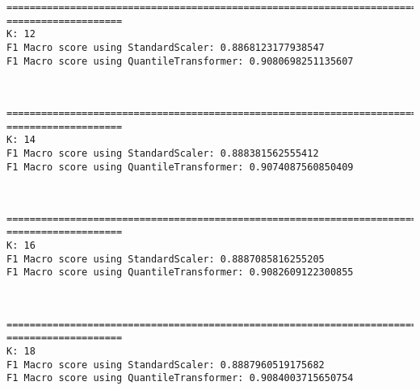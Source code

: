 \documentclass[11pt]{article}
\begin{document}
    \begin{Verbatim}[commandchars=\\\{\}]
================================================================================
====================
K: 12
F1 Macro score using StandardScaler: 0.8868123177938547
F1 Macro score using QuantileTransformer: 0.9080698251135607
    \end{Verbatim}

    \begin{center}
    \end{center}
    { \hspace*{\fill} \\}
    
    \begin{Verbatim}[commandchars=\\\{\}]
================================================================================
====================
K: 14
F1 Macro score using StandardScaler: 0.888381562555412
F1 Macro score using QuantileTransformer: 0.9074087560850409
    \end{Verbatim}

    \begin{center}
    \end{center}
    { \hspace*{\fill} \\}
    
    \begin{Verbatim}[commandchars=\\\{\}]
================================================================================
====================
K: 16
F1 Macro score using StandardScaler: 0.8887085816255205
F1 Macro score using QuantileTransformer: 0.9082609122300855
    \end{Verbatim}

    \begin{center}
    \end{center}
    { \hspace*{\fill} \\}
    
    \begin{Verbatim}[commandchars=\\\{\}]
================================================================================
====================
K: 18
F1 Macro score using StandardScaler: 0.8887960519175682
F1 Macro score using QuantileTransformer: 0.9084003715650754
    \end{Verbatim}
\end{document}
